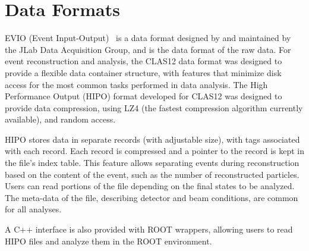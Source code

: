 \section{Data Formats}
\label{sec-formats}

EVIO (Event Input-Output)~\cite{evio} is a data format designed by and maintained by the JLab Data
Acquisition Group, and is the data format of the raw data. For event reconstruction and analysis, the CLAS12
data format was designed to provide a flexible data container structure, with features that minimize disk access
for the most common tasks performed in data analysis. The High Performance Output (HIPO) format developed for
CLAS12 was designed to provide data compression, using LZ4 (the fastest compression algorithm currently available),
and random access.

HIPO stores data in separate records (with adjustable size), with tags associated with each record. Each record
is compressed and a pointer to the record is kept in the file's index table. This feature allows separating events
during reconstruction based on the content of the event, such as the number of reconstructed particles. Users can
read portions of the file depending on the final states to be analyzed.  The meta-data of the file, describing detector
and beam conditions, are common for all analyses.

A C++ interface is also provided with ROOT wrappers, allowing users to read HIPO files and analyze them in the
ROOT environment.

